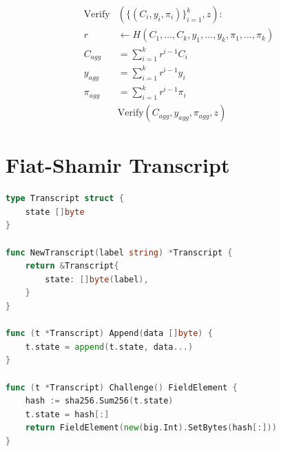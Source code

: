 \documentclass[11pt,a4paper]{article}
\theoremstyle{definition}
\begin{document}
\begin{align}
\text{Verify}&\left(\{(C_i, y_i, \pi_i)\}_{i=1}^{k}, z\right): \\
r &\gets H(C_1, \ldots, C_k, y_1, \ldots, y_k, \pi_1, \ldots, \pi_k) \\
C_{agg} &= \sum_{i=1}^{k} r^{i-1} C_i \\
y_{agg} &= \sum_{i=1}^{k} r^{i-1} y_i \\
\pi_{agg} &= \sum_{i=1}^{k} r^{i-1} \pi_i \\
&\text{Verify}(C_{agg}, y_{agg}, \pi_{agg}, z)
\end{align}

\section{Fiat-Shamir Transcript}

\begin{lstlisting}[language=Go, caption={Transcript Implementation}]
type Transcript struct {
    state []byte
}

func NewTranscript(label string) *Transcript {
    return &Transcript{
        state: []byte(label),
    }
}

func (t *Transcript) Append(data []byte) {
    t.state = append(t.state, data...)
}

func (t *Transcript) Challenge() FieldElement {
    hash := sha256.Sum256(t.state)
    t.state = hash[:]
    return FieldElement(new(big.Int).SetBytes(hash[:]))
}
\end{lstlisting}
\end{document}
